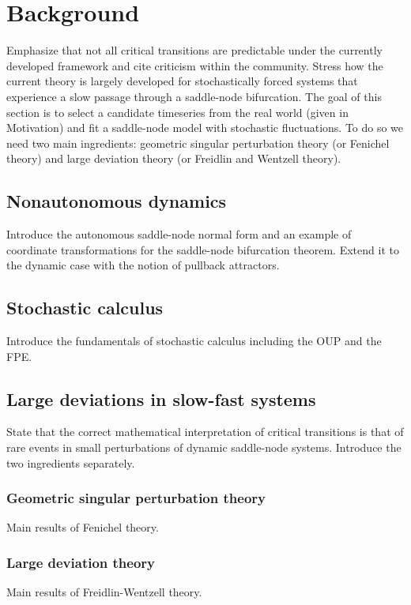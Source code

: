\documentclass[a4paper,12pt,print]{style}
\begin{document}
\chapter{Background}\label{sec:background}
Emphasize that not all critical transitions are predictable under the currently developed framework and cite criticism within the community.
Stress how the current theory is largely developed for stochastically forced systems that experience a slow passage through a saddle-node bifurcation.
The goal of this section is to select a candidate timeseries from the real world (given in Motivation) and fit a saddle-node model with stochastic fluctuations.
To do so we need two main ingredients: geometric singular perturbation theory (or Fenichel theory) and large deviation theory (or Freidlin and Wentzell theory).

\section{Nonautonomous dynamics}\label{subsec:nonautonomous}
Introduce the autonomous saddle-node normal form and an example of coordinate transformations for the saddle-node bifurcation theorem.
Extend it to the dynamic case with the notion of pullback attractors.

\section{Stochastic calculus}\label{subsec:stochastic}
Introduce the fundamentals of stochastic calculus including the OUP and the FPE.

\section{Large deviations in slow-fast systems}\label{subsec:slowfast}
State that the correct mathematical interpretation of critical transitions is that of rare events in small perturbations of dynamic saddle-node systems.
Introduce the two ingredients separately.

\subsection{Geometric singular perturbation theory}\label{subsubsec:gspt}
Main results of Fenichel theory.

\subsection{Large deviation theory}\label{subsubsec:ldt}
Main results of Freidlin-Wentzell theory.
\end{document}

